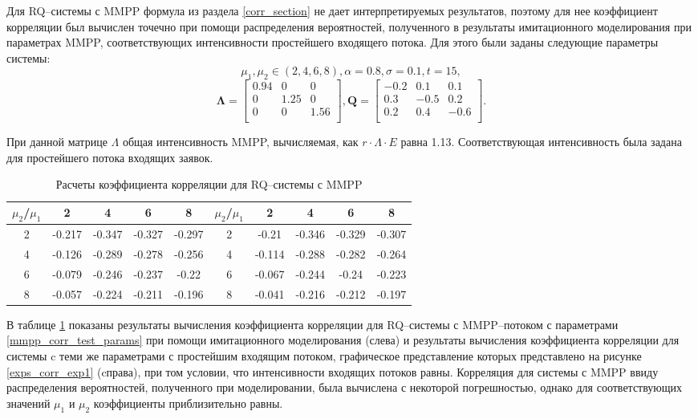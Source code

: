 Для RQ--системы с MMPP формула из раздела \ref{corr_section} не дает интерпретируемых результатов, поэтому для нее коэффициент корреляции был вычислен точечно при помощи распределения вероятностей, полученного в результаты имитационного моделирования при параметрах MMPP, соответствующих интенсивности простейшего входящего потока. Для этого были заданы следующие параметры системы:
 \begin{equation} \label{mmpp_corr_test_params}
\mu_{1},\mu_{2} \in (2,4,6,8), \alpha = 0.8,\sigma = 0.1, t = 15,
\end{equation}
 \begin{equation*}
	\boldsymbol{\Lambda}=\begin{bmatrix}
		0.94 &	0 & 0\\
		0 &	1.25 & 0\\
		0 &	0 & 1.56\\
	\end{bmatrix},
\boldsymbol{Q}=\begin{bmatrix}
	-0.2 &	0.1 & 0.1\\
	0.3 &	-0.5 & 0.2\\
	0.2 & 0.4 & -0.6\\
\end{bmatrix}.
\end{equation*}

При данной матрице $\Lambda$ общая интенсивность MMPP, вычисляемая, как $r\cdot \Lambda\cdot E$ равна 1.13. Соответствующая интенсивность была задана для простейшего потока входящих заявок.

\begin{table}[htb!] 
	\centering
	\caption{Расчеты коэффициента корреляции для RQ--системы с MMPP}
	\label{corr_mmpp_table}
	\begin{tabular}{| c | c | c | c | c || c | c | c | c | c |}
		\hline
		$\mu_{2}$/$\mu_{1}$ & 2 & 4 & 6 & 8 & $\mu_{2}$/$\mu_{1}$ &  2 & 4 & 6 & 8\\ 
		\hline
		2 & -0.217 & -0.347 & -0.327 & -0.297 & 2 & -0.21 & -0.346 & -0.329 & -0.307 \\
		\hline
		4 & -0.126 & -0.289 & -0.278 & -0.256 & 4 & -0.114 & -0.288 & -0.282 & -0.264 \\
		\hline
		6 & -0.079 & -0.246 & -0.237 & -0.22 & 6 & -0.067 & -0.244 & -0.24 & -0.223\\
		\hline
		8 & -0.057 & -0.224 & -0.211 & -0.196 & 8 & -0.041 & -0.216 & -0.212 & -0.197\\
		\hline
	\end{tabular}
\end{table}

В таблице \ref{corr_mmpp_table} показаны результаты вычисления коэффициента корреляции для RQ--системы с MMPP--потоком с параметрами \eqref{mmpp_corr_test_params} при помощи имитационного моделирования (слева) и результаты вычисления коэффициента корреляции для системы c теми же параметрами с простейшим входящим потоком, графическое представление которых представлено на рисунке \ref{exps_corr_exp1} (cправа), при том условии, что интенсивности входящих потоков равны. Корреляция для системы с MMPP ввиду распределения вероятностей, полученного при моделировании, была вычислена с некоторой погрешностью, однако для соответствующих значений $\mu_{1}$ и $\mu_{2}$ коэффициенты приблизительно равны.
\clearpage
